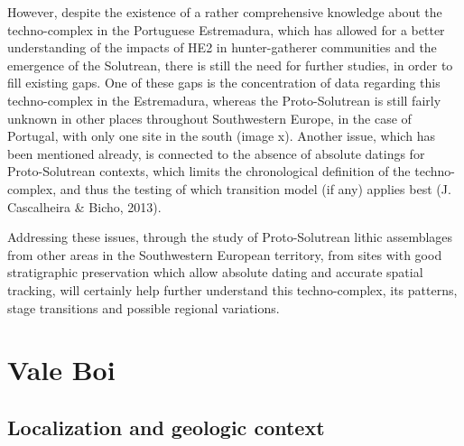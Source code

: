 \documentclass[12pt,twoside]{reedthesis}
\begin{document}
However, despite the existence of a rather comprehensive knowledge about the techno-complex in the Portuguese Estremadura, which has allowed for a better understanding of the impacts of HE2 in hunter-gatherer communities and the emergence of the Solutrean, there is still the need for further studies, in order to fill existing gaps. One of these gaps is the concentration of data regarding this techno-complex in the Estremadura, whereas the Proto-Solutrean is still fairly unknown in other places throughout Southwestern Europe, in the case of Portugal, with only one site in the south (image x). Another issue, which has been mentioned already, is connected to the absence of absolute datings for Proto-Solutrean contexts, which limits the chronological definition of the techno-complex, and thus the testing of which transition model (if any) applies best (J. Cascalheira \& Bicho, 2013).

Addressing these issues, through the study of Proto-Solutrean lithic assemblages from other areas in the Southwestern European territory, from sites with good stratigraphic preservation which allow absolute dating and accurate spatial tracking, will certainly help further understand this techno-complex, its patterns, stage transitions and possible regional variations.

\hypertarget{vale-boi}{%
\chapter{Vale Boi}\label{vale-boi}}

\hypertarget{localization-and-geologic-context}{%
\section{Localization and geologic context}\label{localization-and-geologic-context}}
\end{document}
